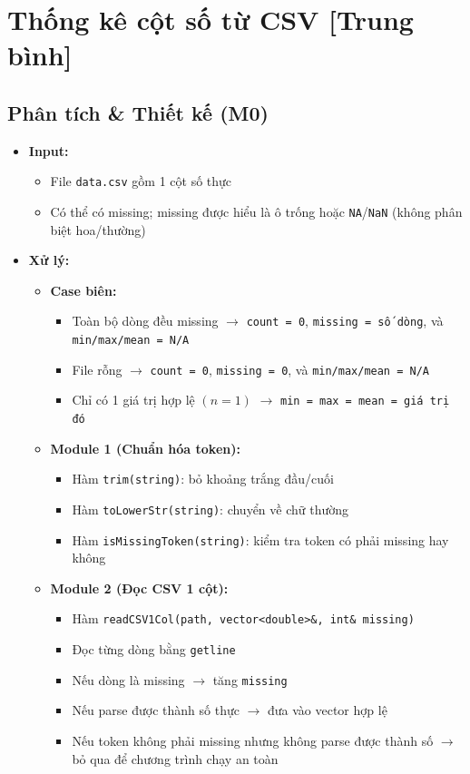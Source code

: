 \section{Thống kê cột số từ CSV [Trung bình]}

\subsection{Phân tích \& Thiết kế (M0)}
\begin{itemize}
    \item \textbf{Input:}
    \begin{itemize}
        \item File \texttt{data.csv} gồm 1 cột số thực
        \item Có thể có missing; missing được hiểu là ô trống hoặc \texttt{NA}/\texttt{NaN} (không phân biệt hoa/thường)
    \end{itemize}

    \item \textbf{Xử lý:}
    \begin{itemize}
        \item \textbf{Case biên:}
        \begin{itemize}
            \item Toàn bộ dòng đều missing $\rightarrow$ \texttt{count = 0}, \texttt{missing = số dòng}, và \texttt{min/max/mean = N/A}
            \item File rỗng $\rightarrow$ \texttt{count = 0}, \texttt{missing = 0}, và \texttt{min/max/mean = N/A}
            \item Chỉ có 1 giá trị hợp lệ $(n = 1)$ $\rightarrow$ \texttt{min = max = mean = giá trị đó}
        \end{itemize}

        \item \textbf{Module 1 (Chuẩn hóa token):}
        \begin{itemize}
            \item Hàm \texttt{trim(string)}: bỏ khoảng trắng đầu/cuối
            \item Hàm \texttt{toLowerStr(string)}: chuyển về chữ thường
            \item Hàm \texttt{isMissingToken(string)}: kiểm tra token có phải missing hay không
        \end{itemize}

        \item \textbf{Module 2 (Đọc CSV 1 cột):}
        \begin{itemize}
            \item Hàm \texttt{readCSV1Col(path, vector<double>\&, int\& missing)}
            \item Đọc từng dòng bằng \texttt{getline}
            \item Nếu dòng là missing $\rightarrow$ tăng \texttt{missing}
            \item Nếu parse được thành số thực $\rightarrow$ đưa vào vector hợp lệ
            \item Nếu token không phải missing nhưng không parse được thành số $\rightarrow$ bỏ qua để chương trình chạy an toàn
        \end{itemize}


\end{itemize}
\end{itemize}
